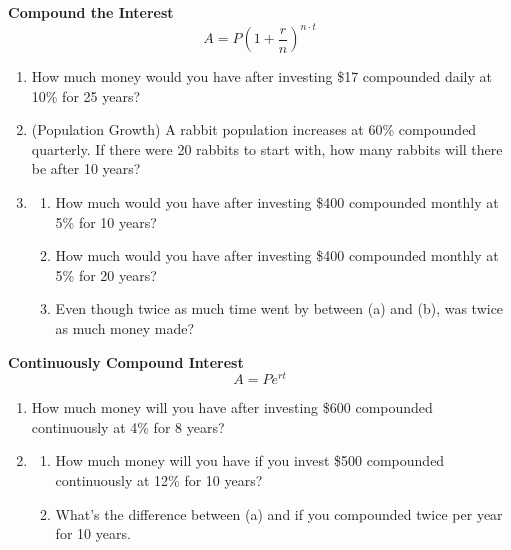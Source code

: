\documentclass[12pt]{article}
\begin{document}
\hrulefill

\textbf{Compound the Interest}\\

$$A=P\left(1+\frac{r}{n}\right)^{n \cdot t}$$

\begin{enumerate}[resume]

\item How much money would you have after investing \$17 compounded daily at 10\% for 25 years?\\

\item (Population Growth) A rabbit population increases at 60\% compounded quarterly. If there were 20 rabbits to start with, how many rabbits will there be after 10 years?\\

\item 	\begin{enumerate}

			\item How much would you have after investing \$400 compounded monthly at 5\% for 10 years?\\

			\item How much would you have after investing \$400 compounded monthly at 5\% for 20 years?\\
			
			\item Even though twice as much time went by between (a) and (b), was twice as much money made?\\

		\end{enumerate} 

\end{enumerate}

\hrulefill

\textbf{Continuously Compound Interest}\\

$$A=Pe^{rt}$$

\begin{enumerate}[resume]

\item How much money will you have after investing \$600 compounded continuously at 4\% for 8 years?\\

\vspace{1cm}

\item 	\begin{enumerate}
		
			\item How much money will you have if you invest \$500 compounded continuously at 12\% for 10 years?\\
			
			\item What's the difference between (a) and if you compounded twice per year for 10 years.\\
			
		\end{enumerate}

\end{enumerate}
\end{document}
